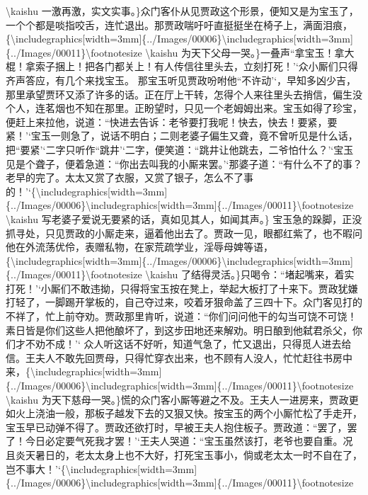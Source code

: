 \textbackslash{}kaishu
一激再激，实文实事。\}众门客仆从见贾政这个形景，便知又是为宝玉了，一个个都是啖指咬舌，连忙退出。那贾政喘吁吁直挺挺坐在椅子上，满面泪痕，\{\textbackslash{}includegraphics{[}width=3mm{]}\{../Images/00006\}\textbackslash{}includegraphics{[}width=3mm{]}\{../Images/00011\}\textbackslash{}footnotesize
\textbackslash{}kaishu
为天下父母一哭。\}一叠声``拿宝玉！拿大棍！拿索子捆上！把各门都关上！有人传信往里头去，立刻打死！'`众小厮们只得齐声答应，有几个来找宝玉。
那宝玉听见贾政吩咐他``不许动'`，早知多凶少吉，那里承望贾环又添了许多的话。正在厅上干转，怎得个人来往里头去捎信，偏生没个人，连茗烟也不知在那里。正盼望时，只见一个老姆姆出来。宝玉如得了珍宝，便赶上来拉他，说道：``快进去告诉：老爷要打我呢！快去，快去！要紧，要紧！'`宝玉一则急了，说话不明白；二则老婆子偏生又聋，竟不曾听见是什么话，把``要紧'`二字只听作``跳井'`二字，便笑道：``跳井让他跳去，二爷怕什么？'`宝玉见是个聋子，便着急道：``你出去叫我的小厮来罢。'`那婆子道：``有什么不了的事？老早的完了。太太又赏了衣服，又赏了银子，怎么不了事的！'`\{\textbackslash{}includegraphics{[}width=3mm{]}\{../Images/00006\}\textbackslash{}includegraphics{[}width=3mm{]}\{../Images/00011\}\textbackslash{}footnotesize
\textbackslash{}kaishu 写老婆子爱说无要紧的话，真如见其人，如闻其声。\}
宝玉急的跺脚，正没抓寻处，只见贾政的小厮走来，逼着他出去了。贾政一见，眼都红紫了，也不暇问他在外流荡优伶，表赠私物，在家荒疏学业，淫辱母婢等语，\{\textbackslash{}includegraphics{[}width=3mm{]}\{../Images/00006\}\textbackslash{}includegraphics{[}width=3mm{]}\{../Images/00011\}\textbackslash{}footnotesize
\textbackslash{}kaishu
了结得灵活。\}只喝令：``堵起嘴来，着实打死！'`小厮们不敢违拗，只得将宝玉按在凳上，举起大板打了十来下。贾政犹嫌打轻了，一脚踢开掌板的，自己夺过来，咬着牙狠命盖了三四十下。众门客见打的不祥了，忙上前夺劝。贾政那里肯听，说道：``你们问问他干的勾当可饶不可饶！素日皆是你们这些人把他酿坏了，到这步田地还来解劝。明日酿到他弑君杀父，你们才不劝不成！'`
众人听这话不好听，知道气急了，忙又退出，只得觅人进去给信。王夫人不敢先回贾母，只得忙穿衣出来，也不顾有人没人，忙忙赶往书房中来，\{\textbackslash{}includegraphics{[}width=3mm{]}\{../Images/00006\}\textbackslash{}includegraphics{[}width=3mm{]}\{../Images/00011\}\textbackslash{}footnotesize
\textbackslash{}kaishu
为天下慈母一哭。\}慌的众门客小厮等避之不及。王夫人一进房来，贾政更如火上浇油一般，那板子越发下去的又狠又快。按宝玉的两个小厮忙松了手走开，宝玉早已动弹不得了。贾政还欲打时，早被王夫人抱住板子。贾政道：``罢了，罢了！今日必定要气死我才罢！'`王夫人哭道：``宝玉虽然该打，老爷也要自重。况且炎天暑日的，老太太身上也不大好，打死宝玉事小，倘或老太太一时不自在了，岂不事大！'`\{\textbackslash{}includegraphics{[}width=3mm{]}\{../Images/00006\}\textbackslash{}includegraphics{[}width=3mm{]}\{../Images/00011\}\textbackslash{}footnotesize
